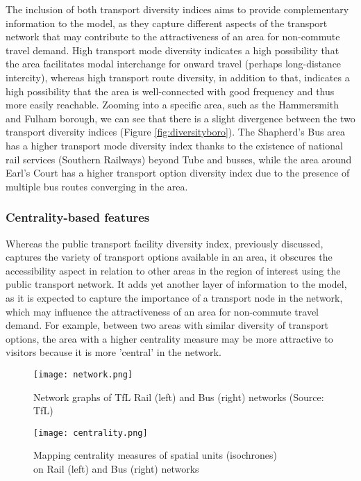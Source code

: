 The inclusion of both transport diversity indices aims to provide complementary information to the model, as they capture different aspects of the transport network that may contribute to the attractiveness of an area for non-commute travel demand. High transport mode diversity indicates a high possibility that the area facilitates modal interchange for onward travel (perhaps long-distance intercity), whereas high transport route diversity, in addition to that, indicates a high possibility that the area is well-connected with good frequency and thus more easily reachable. Zooming into a specific area, such as the Hammersmith and Fulham borough, we can see that there is a slight divergence between the two transport diversity indices (Figure \ref{fig:diversityboro}). The Shapherd's Bus area has a higher transport mode diversity index thanks to the existence of national rail services (Southern Railways) beyond Tube and busses, while the area around Earl's Court has a higher transport option diversity index due to the presence of multiple bus routes converging in the area.

\subsubsection*{Centrality-based features}
Whereas the public transport facility diversity index, previously discussed, captures the variety of transport options available in an area, it obscures the accessibility aspect in relation to other areas in the region of interest using the public transport network. It adds yet another layer of information to the model, as it is expected to capture the importance of a transport node in the network, which may influence the attractiveness of an area for non-commute travel demand. For example, between two areas with similar diversity of transport options, the area with a higher centrality measure may be more attractive to visitors because it is more 'central' in the network. 

\begin{figure}[!hbt]
    \centering
    \texttt{[image: network.png]}
    \captionsetup{justification=centering}
    \caption{Network graphs of TfL Rail (left) and Bus (right) networks (Source: TfL)}
    \label{fig:network}
\end{figure}

\begin{figure}[!ht]
    \centering
    \texttt{[image: centrality.png]}
    \captionsetup{justification=centering}
    \caption{Mapping centrality measures of spatial units (isochrones)\\on Rail (left) and Bus (right) networks}
    \label{fig:centrality}
\end{figure}

